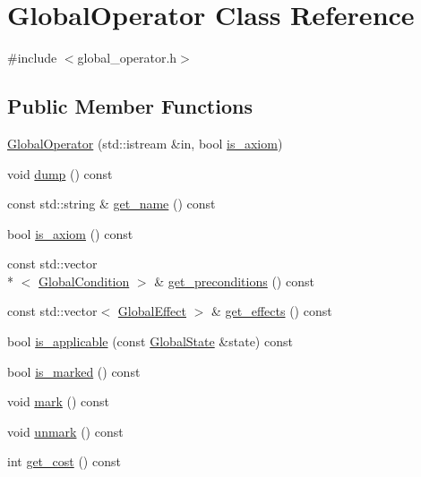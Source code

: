 \hypertarget{classGlobalOperator}{\section{Global\-Operator Class Reference}
\label{classGlobalOperator}
}


{\ttfamily \#include $<$global\-\_\-operator.\-h$>$}

\subsection*{Public Member Functions}
\begin{DoxyCompactItemize}
\item 
\hyperlink{classGlobalOperator_a550ed15585058f0a2f8a71a579714907}{Global\-Operator} (std\-::istream \&in, bool \hyperlink{classGlobalOperator_a0c9c5fce70001d45a29d8d3d4bd745bf}{is\-\_\-axiom})
\item 
void \hyperlink{classGlobalOperator_aa82116657c9d0e8ec8678472c212d696}{dump} () const 
\item 
const std\-::string \& \hyperlink{classGlobalOperator_a2011d37b6e7faa12b0fd14d86fedd486}{get\-\_\-name} () const 
\item 
bool \hyperlink{classGlobalOperator_a0c9c5fce70001d45a29d8d3d4bd745bf}{is\-\_\-axiom} () const 
\item 
const std\-::vector\\*
$<$ \hyperlink{structGlobalCondition}{Global\-Condition} $>$ \& \hyperlink{classGlobalOperator_aff64eec39692326f31d30792c1b5d8f8}{get\-\_\-preconditions} () const 
\item 
const std\-::vector$<$ \hyperlink{structGlobalEffect}{Global\-Effect} $>$ \& \hyperlink{classGlobalOperator_a70bea7144ee8af6f526f6a29579da51f}{get\-\_\-effects} () const 
\item 
bool \hyperlink{classGlobalOperator_a1ff01782c1cc16bb07060f370dbe87b8}{is\-\_\-applicable} (const \hyperlink{classGlobalState}{Global\-State} \&state) const 
\item 
bool \hyperlink{classGlobalOperator_a48da06dfedb0e1192e157d63bd274f4f}{is\-\_\-marked} () const 
\item 
void \hyperlink{classGlobalOperator_abaeed24044a7cacb29b655d32f000215}{mark} () const 
\item 
void \hyperlink{classGlobalOperator_aa82d58b4145f4f967aaca7311da935a5}{unmark} () const 
\item 
int \hyperlink{classGlobalOperator_a599fca43db2814e373553974b1237e99}{get\-\_\-cost} () const 
\end{DoxyCompactItemize}



